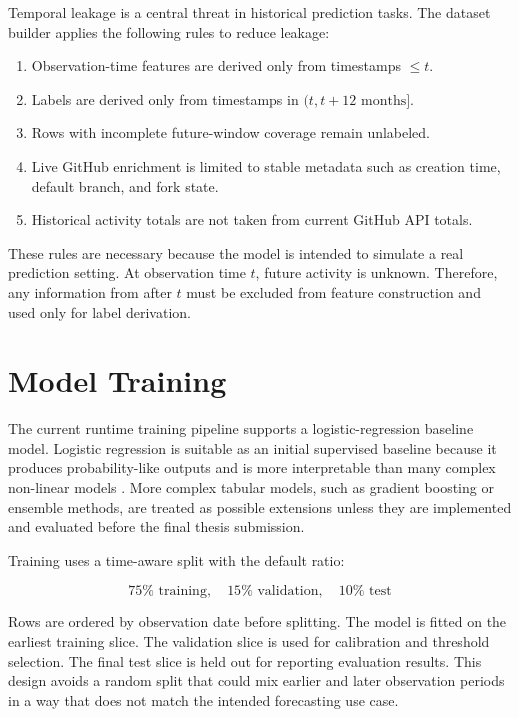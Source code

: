 Temporal leakage is a central threat in historical prediction tasks. The dataset builder applies the following rules to reduce leakage:

\begin{enumerate}
    \item Observation-time features are derived only from timestamps \( \leq t \).
    \item Labels are derived only from timestamps in \( (t, t + 12\text{ months}] \).
    \item Rows with incomplete future-window coverage remain unlabeled.
    \item Live GitHub enrichment is limited to stable metadata such as creation time, default branch, and fork state.
    \item Historical activity totals are not taken from current GitHub API totals.
\end{enumerate}

These rules are necessary because the model is intended to simulate a real prediction setting. At observation time \(t\), future activity is unknown. Therefore, any information from after \(t\) must be excluded from feature construction and used only for label derivation.

\section{Model Training}
\label{sec:method-model-training}

The current runtime training pipeline supports a logistic-regression baseline model. Logistic regression is suitable as an initial supervised baseline because it produces probability-like outputs and is more interpretable than many complex non-linear models \cite{james2021islr}. More complex tabular models, such as gradient boosting or ensemble methods, are treated as possible extensions unless they are implemented and evaluated before the final thesis submission.

Training uses a time-aware split with the default ratio:

\[
75\% \text{ training}, \quad 15\% \text{ validation}, \quad 10\% \text{ test}
\]

Rows are ordered by observation date before splitting. The model is fitted on the earliest training slice. The validation slice is used for calibration and threshold selection. The final test slice is held out for reporting evaluation results. This design avoids a random split that could mix earlier and later observation periods in a way that does not match the intended forecasting use case.

